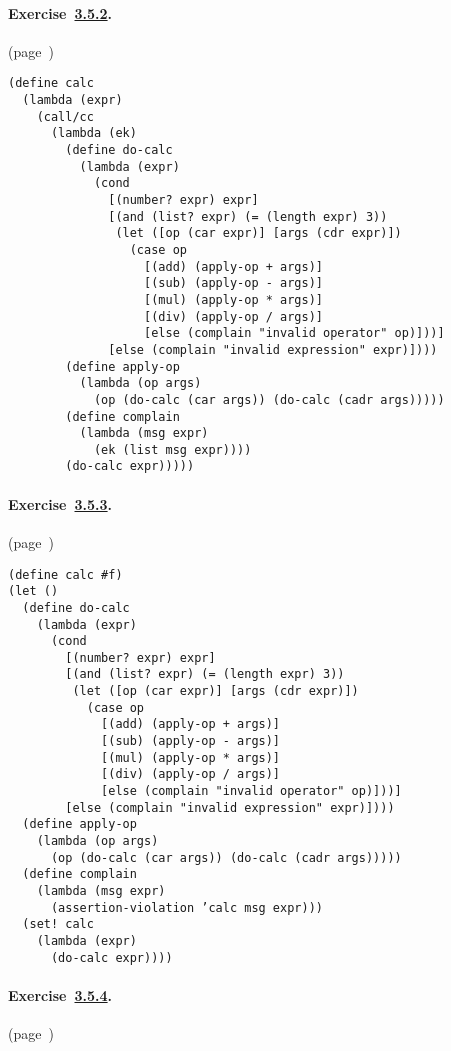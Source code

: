 \paragraph{Exercise \hyperref[further_g81]{3.5.2}. }(page \pageref{further_s87})

  
\begin{alltt}
 (define calc
   (lambda (expr)
     (call/cc
       (lambda (ek)
         (define do-calc
           (lambda (expr)
             (cond
               [(number? expr) expr]
               [(and (list? expr) (= (length expr) 3))
                (let ([op (car expr)] [args (cdr expr)])
                  (case op
                    [(add) (apply-op + args)]
                    [(sub) (apply-op - args)]
                    [(mul) (apply-op * args)]
                    [(div) (apply-op / args)]
                    [else (complain "invalid operator" op)]))]
               [else (complain "invalid expression" expr)])))
         (define apply-op
           (lambda (op args)
             (op (do-calc (car args)) (do-calc (cadr args)))))
         (define complain
           (lambda (msg expr)
             (ek (list msg expr))))
         (do-calc expr)))))
\end{alltt}



\paragraph{Exercise \hyperref[further_g82]{3.5.3}. }(page \pageref{further_s88})

  
\begin{alltt}
 (define calc \#{}f)
 (let ()
   (define do-calc
     (lambda (expr)
       (cond
         [(number? expr) expr]
         [(and (list? expr) (= (length expr) 3))
          (let ([op (car expr)] [args (cdr expr)])
            (case op
              [(add) (apply-op + args)]
              [(sub) (apply-op - args)]
              [(mul) (apply-op * args)]
              [(div) (apply-op / args)]
              [else (complain "invalid operator" op)]))]
         [else (complain "invalid expression" expr)])))
   (define apply-op
     (lambda (op args)
       (op (do-calc (car args)) (do-calc (cadr args)))))
   (define complain
     (lambda (msg expr)
       (assertion-violation 'calc msg expr)))
   (set! calc
     (lambda (expr)
       (do-calc expr))))
\end{alltt}



\paragraph{Exercise \hyperref[further_g83]{3.5.4}. }(page \pageref{further_s89})

